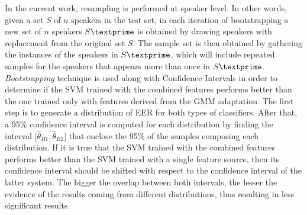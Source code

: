 In the current work, resampling is performed at speaker level.
In other words, given a set $S$ of $n$ speakers in the
test set, in each iteration of bootstrapping
a new set of $n$ speakers $S\textprime$ is obtained by drawing speakers with replacement from the
original set $S$. The sample set is then obtained by gathering the instances of the speakers
in $S\textprime$, which will include repeated samples for the speakers that appears more than once
in $S\textprime$.
\textit{Bootstrapping} technique is used along with Confidence
Intervals in order to determine if the SVM trained with the combined features
performs better than the one trained only with features derived from the GMM adaptation.
The first step is to generate a distribution of EER for both types of classifiers.
After that,
a 95\% confidence interval is computed for each distribution by finding the interval
[$\hat{\theta}_{B1}, \hat{\theta}_{B2}$] that enclose the 95\% of the samples
composing each distribution.
If it is true that the SVM trained with
the combined features performs better than the
SVM trained with a single feature source, then its confidence
interval should be shifted with respect to the confidence interval
of the latter system.
The bigger the overlap between both intervals, the
lesser the evidence of the results coming from different distributions, thus
resulting in less significant results.
